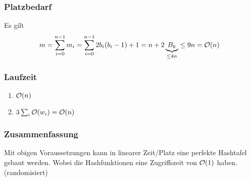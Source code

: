                 \subsubsection{Platzbedarf}
                    Es gilt 
                    $$
                        m = \sum_{i=0}^{n-1}{m_i} = \sum_{i=0}^{n-1}{2b_i(b_i-1)+1}= n + 2 \underbrace{B_k}_{\leq 4n} \leq 9n = \mathcal{O}(n)
                    $$
                    
                \subsubsection{Laufzeit}
                    \begin{enumerate}
                        \item $\mathcal{O}(n)$
                        \item $3\sum_i{\mathcal{O}(w_i)} = \mathcal{O}(n)$
                    \end{enumerate}
                    
                \subsubsection{Zusammenfassung}
                    \begin{satz}
                        Mit obigen Voraussetzungen kann in linearer Zeit/Platz eine perfekte Hashtafel gebaut werden. Wobei die Hashfunktionen eine Zugriffszeit von $\mathcal{O}(1)$ haben. (randomisiert)
                    \end{satz}
                    
